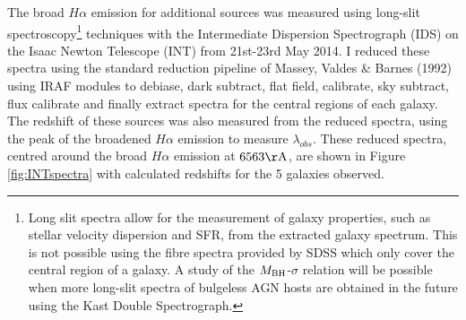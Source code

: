 The broad $H\alpha$ emission for  { additional sources} was measured using long-slit spectroscopy\footnote{Long slit spectra allow for the measurement of galaxy properties, such as stellar velocity dispersion and SFR, from the extracted galaxy spectrum. This is not possible using the fibre spectra provided by SDSS which only cover the central region of a galaxy. A study of the $M_{\rm{BH}}$-$\sigma$ relation will be possible when more long-slit spectra of bulgeless AGN hosts are obtained in the future using the Kast Double Spectrograph.} techniques with the Intermediate Dispersion Spectrograph (IDS) on the Isaac Newton Telescope (INT) from 21st-23rd May 2014. I reduced these spectra using the standard reduction pipeline of Massey, Valdes \& Barnes (1992) using IRAF modules to debiase, dark subtract, flat field, calibrate, sky subtract, flux calibrate and finally extract spectra for the central regions of each galaxy. The redshift of these sources was also measured from the reduced spectra, using the peak of the broadened $H\alpha$ emission to measure $\lambda_{obs}$. These reduced spectra, centred around the broad $H\alpha$ emission at $6563\rm{\AA}$, are shown in Figure \ref{fig:INTspectra} with calculated redshifts for the 5 galaxies observed.



